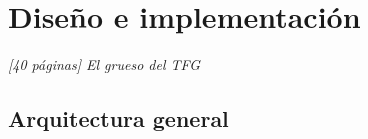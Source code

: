 \chapter{Diseño e implementación}
\label{chap:diseno}

\textit{[40 páginas] El grueso del TFG}

\section{Arquitectura general} 
\label{sec:diseno_arquitectura}
